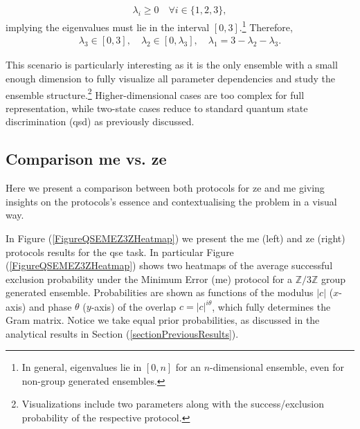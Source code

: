 \documentclass[12pt,letterpaper]{article}
\begin{document}
\begin{align*}
	\lambda_i \geq 0 \quad \forall i \in \{1,2,3\},
\end{align*}
implying the eigenvalues must lie in the interval $[0,3]$.\footnote{In general, eigenvalues lie in $[0,n]$ for an $n$-dimensional ensemble, even for non-group generated ensembles.} Therefore,
\begin{align*}
	\lambda_3 \in [0,3], \quad \lambda_2 \in [0,\lambda_3], \quad \lambda_1 = 3 - \lambda_2 - \lambda_3.
\end{align*}

This scenario is particularly interesting as it is the only ensemble with a small enough dimension to fully visualize all parameter dependencies and study the ensemble structure.\footnote{Visualizations include two parameters along with the success/exclusion probability of the respective protocol.} Higher-dimensional cases are too complex for full representation, while two-state cases reduce to standard quantum state discrimination (\gls{qsd}) as previously discussed.

\subsection{Comparison \gls{me} vs. \gls{ze}}

\hspace{20pt}Here we present a comparison between both protocols for \gls{ze} and \gls{me} giving insights on the protocols's essence and contextualising the problem in a visual way.

In Figure (\ref{FigureQSEMEZ3ZHeatmap})  we present the \gls{me} (left) and \gls{ze} (right) protocols results for the \gls{qse} task. In particular Figure (\ref{FigureQSEMEZ3ZHeatmap}) shows two heatmaps of the average successful exclusion probability under the Minimum Error (\gls{me}) protocol for a $\mathbb{Z}/3\mathbb{Z}$ group generated ensemble. Probabilities are shown as functions of the modulus $|c|$ ($x$-axis) and phase $\theta$ ($y$-axis) of the overlap $c=|c|^{i\theta}$, which fully determines the Gram matrix. Notice we take equal prior probabilities, as discussed in the analytical results in Section (\ref{sectionPreviousResults}). 
\end{document}
